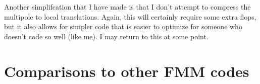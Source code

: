 \documentclass{article}
\begin{document}
Another simplifcation that I have made is that I don't attempt to compress the multipole to local translations. Again, this will certainly require some extra flops, but it also allows for simpler code that is easier to optimize for someone who doesn't code so well (like me). I may return to this at some point.



\section{Comparisons to other FMM codes}
\end{document}
